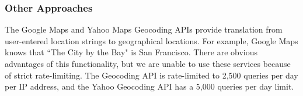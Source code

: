 \subsubsection{Other Approaches}
\noindent The Google Maps and Yahoo Maps Geocoding APIs provide translation from user-entered location strings to geographical locations.  For example, Google Maps knows that ``The City by the Bay" is San Francisco.  There are obvious advantages of this functionality, but we are unable to use these services because of strict rate-limiting.  The Geocoding API is rate-limited to 2,500 queries per day per IP address, and the Yahoo Geocoding API has a 5,000 queries per day limit.\\\\

